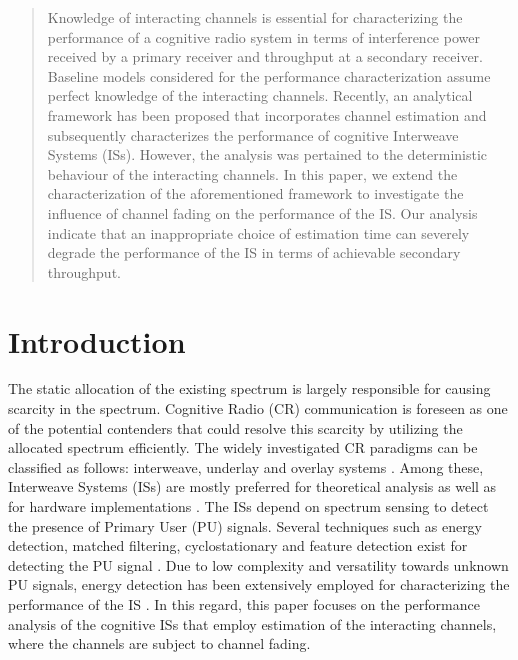 
\begin{abstract}
Knowledge of interacting channels is essential for characterizing the performance of a cognitive radio system in terms of interference power received by a primary receiver and throughput at a secondary receiver. Baseline models considered for the performance characterization assume perfect knowledge of the interacting channels. Recently, an analytical framework has been proposed that incorporates channel estimation and subsequently characterizes the performance of cognitive Interweave Systems (ISs). However, the analysis was pertained to the deterministic behaviour of the interacting channels. In this paper, we extend the characterization of the aforementioned framework to investigate the influence of channel fading on the performance of the IS. %
Our analysis indicate that an inappropriate choice of estimation time can severely degrade the performance of the IS in terms of achievable secondary throughput. %
\end{abstract}


\section{Introduction}
The static allocation of the existing spectrum is largely responsible for causing scarcity in the spectrum. Cognitive Radio (CR) communication is foreseen as one of the potential contenders that could resolve this scarcity by utilizing the allocated spectrum efficiently. The widely investigated CR paradigms can be classified as follows: interweave, underlay and overlay systems \cite{Goldsmith09}. Among these, Interweave Systems (ISs) are mostly preferred for theoretical analysis as well as for hardware implementations \cite{Kaushik13, Kaushik15_Dy}. The ISs depend on spectrum sensing to detect the presence of Primary User (PU) signals. Several techniques such as energy detection, matched filtering, cyclostationary and feature detection exist for detecting the PU signal \cite{Sharma15}. Due to low complexity and versatility towards unknown PU signals, energy detection has been extensively employed for characterizing the performance of the IS \cite{Tan08, Liang08, Sharkasi12, Pradhan15}. In this regard, this paper focuses on the performance analysis of the cognitive ISs that employ estimation of the interacting channels, where the channels are subject to channel fading. 

